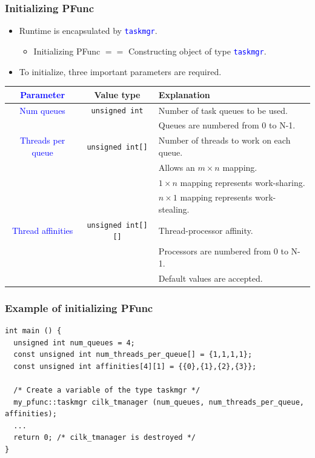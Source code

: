 \documentclass{beamer}
\newcommand{\code}[1]{\lstinline[basicstyle=\sffamily]{#1}}
\newcommand{\tablefont}{\fontsize{8}{13}\selectfont}
\begin{document}
\begin{frame}
\frametitle{Initializing PFunc}
\begin{itemize}
\item Runtime is encapsulated by \textcolor{blue}{\code{taskmgr}}.
  \begin{itemize}
  \item Initializing PFunc $==$ Constructing object of type \textcolor{blue}{\code{taskmgr}}.
  \end{itemize}
\item To initialize, three important parameters are required.
\end{itemize}
\tablefont
\begin{tabular}{|c|c|l|}
\hline
\textcolor{blue}{Parameter} & Value type & Explanation \\
\hline
\textcolor{blue}{Num queues} & \code{unsigned int} & Number of task queues to be used. \\
           &                     & Queues are numbered from 0 to N-1. \\
\hline
\textcolor{blue}{Threads per queue} & \code{unsigned int[]} & Number of threads to work on each queue. \\
                      &                       & Allows an $m\times{}n$ mapping. \\
                      &                       & $1\times{}n$ mapping represents work-sharing. \\
                      &                       & $n\times{}1$ mapping represents work-stealing. \\
\hline
\textcolor{blue}{Thread affinities} & \code{unsigned int[][]} & Thread-processor affinity. \\
                  &                         & Processors are numbered from 0 to N-1. \\
                  &                         & Default values are accepted. \\
\hline
\end{tabular}
\normalsize
\end{frame}

\begin{frame}[fragile]
\frametitle{Example of initializing PFunc}
\begin{lstlisting}[basicstyle=\tablefont]
int main () {
  unsigned int num_queues = 4;
  const unsigned int num_threads_per_queue[] = {1,1,1,1};
  const unsigned int affinities[4][1] = {{0},{1},{2},{3}};

  /* Create a variable of the type taskmgr */
  my_pfunc::taskmgr cilk_tmanager (num_queues, num_threads_per_queue, affinities);
  ...
  return 0; /* cilk_tmanager is destroyed */
}
\end{lstlisting}
\end{frame}
\end{document}
